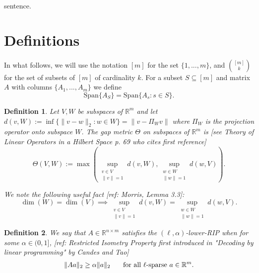 \documentclass[journal,onecolumn]{IEEEtran}
\newtheorem{definition}{Definition}
\begin{document}
 sentence. 

\section{Definitions}

In what follows, we will use the notation $[m]$ for the set $\{1, ..., m\}$, and ${[m] \choose k}$ for the set of subsets of $[m]$ of cardinality $k$. For a subset $S \subseteq [m]$ and matrix $A$ with columns $\{A_1,...,A_m\}$ we define
\begin{equation*}
\text{Span}\{A_S\} = \text{Span}\{A_s: s \in S\}.
\end{equation*}

\begin{definition}
Let $V, W$ be subspaces of $\mathbb{R}^m$ and let $d(v,W) := \inf\{\|v-w\|_2: w \in W\} = \|v - \Pi_W v\|$ where $\Pi_W$ is the projection operator onto subspace $W$. The \emph{gap} metric $\Theta$ on subspaces of $\mathbb{R}^{m}$ is [see Theory of Linear Operators in a Hilbert Space p. 69 who cites first reference]
\begin{equation}\label{SubspaceMetric}
\Theta(V,W) := \max\left( \sup_{\substack{v \in V \\ \|v\| = 1}} d(v,W), \sup_{\substack{w \in W \\ \|w\| = 1}} d(w,V) \right).
\end{equation}

We note the following useful fact [ref: Morris, Lemma 3.3]:
\begin{equation}\label{SubspaceMetricSameDim}
\dim(W) = \dim(V) \implies \sup_{\substack{v \in V \\ \|v\| = 1}}  d(v,W)  = \sup_{\substack{w \in W \\ \|w\| = 1}} d(w,V).
\end{equation}
\end{definition}

\begin{definition}\label{RestrictedIsometryProperty}
We say that $A \in  \mathbb R^{n \times m}$ satisfies the \emph{$(\ell,\alpha)$-lower-RIP}  when for some $\alpha \in (0,1]$, [ref: Restricted Isometry Property first introduced in "Decoding by linear programming" by Candes and Tao]
\begin{align*}
\|Aa\|_2 \geq  \alpha \|a\|_2 \indent \text{ for all $\ell$-sparse } a \in \mathbb{R}^m.
\end{align*}
\end{definition}
\end{document}
